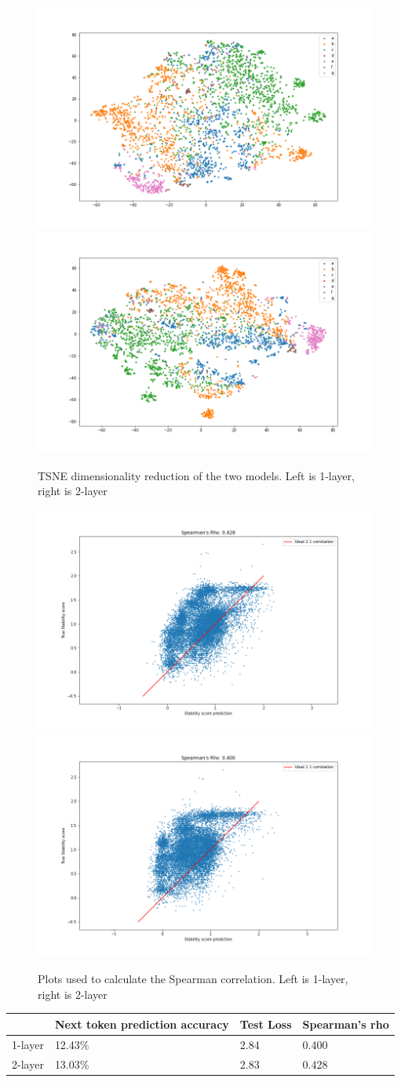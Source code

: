 \begin{figure}[h]
  	\includegraphics[width=0.4\linewidth]{latex/imgs/tsne_1_layer_with_schedule_512_final.png}
  	\includegraphics[width=0.4\linewidth]{latex/imgs/tsne_2_layer_no_drop_final.png}
	\caption{TSNE dimensionality reduction of the two models. Left is 1-layer, right is 2-layer}
\end{figure}

\begin{figure}[h]
	\includegraphics[width=0.4\linewidth]{latex/imgs/spearman_1_layer_with_schedule_512_final.png}
	\includegraphics[width=0.4\linewidth]{latex/imgs/spearman_2_layer_no_drop_final.png}
	\caption{Plots used to calculate the Spearman correlation. Left is 1-layer, right is 2-layer}
\end{figure}

\begin{table}[]
\begin{tabular}{|l|l|l|l|}
\hline
        & Next token prediction accuracy & Test Loss & Spearman's rho\\ \hline
1-layer & 12.43\%                        & 2.84      & 0.400         \\ \hline
2-layer & 13.03\%                        & 2.83      & 0.428         \\ \hline
\end{tabular}
\end{table}